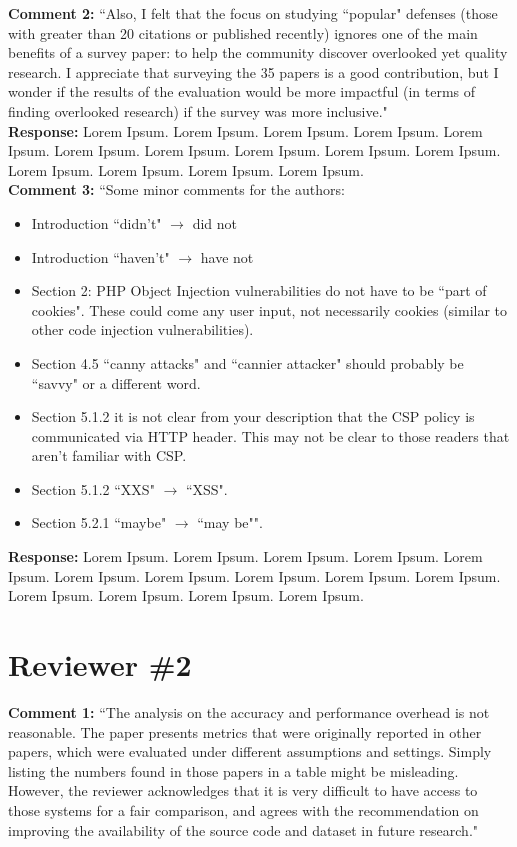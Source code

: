 \documentclass[10pt,journal,compsoc]{IEEEtran}
\begin{document}
\noindent
{\bf Comment 2:} ``Also, I felt that the focus on studying ``popular" defenses (those with
greater than 20 citations or published recently) ignores one of the	
main benefits of a survey paper: to help the community discover
overlooked yet quality research. I appreciate that surveying the 35
papers is a good contribution, but I wonder if the results of the
evaluation would be more impactful (in terms of finding overlooked
research) if the survey was more inclusive."\\

\noindent
{\bf Response:}
Lorem Ipsum. Lorem Ipsum. Lorem Ipsum. Lorem Ipsum. Lorem Ipsum. Lorem Ipsum. Lorem Ipsum. Lorem Ipsum. Lorem Ipsum. Lorem Ipsum. Lorem Ipsum. Lorem Ipsum. Lorem Ipsum. Lorem Ipsum.\\

\noindent
{\bf Comment 3:} ``Some minor comments for the authors:
\begin{itemize}
\item Introduction ``didn't" $\rightarrow$ did not
\item Introduction ``haven't" $\rightarrow$ have not
\item Section 2: PHP Object Injection vulnerabilities do not have to be
 ``part of cookies". These could come any user input, not necessarily
 cookies (similar to other code injection vulnerabilities).
\item Section 4.5 ``canny attacks" and ``cannier attacker" should probably
 be ``savvy" or a different word.
\item Section 5.1.2 it is not clear from your description that the CSP
 policy is communicated via HTTP header. This may not be clear to
 those readers that aren't familiar with CSP.
\item Section 5.1.2 ``XXS" $\rightarrow$ ``XSS".
\item Section 5.2.1 ``maybe" $\rightarrow$ ``may be"".
\end{itemize}

\noindent
{\bf Response:}
Lorem Ipsum. Lorem Ipsum. Lorem Ipsum. Lorem Ipsum. Lorem Ipsum. Lorem Ipsum. Lorem Ipsum. Lorem Ipsum. Lorem Ipsum. Lorem Ipsum. Lorem Ipsum. Lorem Ipsum. Lorem Ipsum. Lorem Ipsum.\\

\section{Reviewer \#2}
\label{sec:r2}

{\bf Comment 1:} ``Τhe analysis on the accuracy and performance overhead is not reasonable. The paper presents metrics that were originally reported in other papers, which were evaluated under different assumptions and settings. Simply listing the numbers found in those papers in a table might be misleading. However, the reviewer acknowledges that it is very difficult to have access to those systems for a fair comparison, and agrees with the recommendation on improving the availability of the source code and dataset in future research."\\
\end{document}
